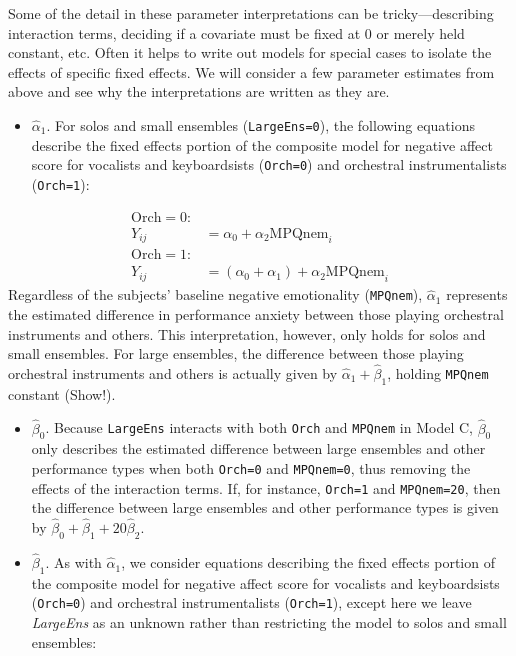\documentclass[
]{krantz}
\providecommand{\tightlist}{%
  \setlength{\itemsep}{0pt}\setlength{\parskip}{0pt}}
\begin{document}
Some of the detail in these parameter interpretations can be tricky---describing interaction terms, deciding if a covariate must be fixed at 0 or merely held constant, etc. Often it helps to write out models for special cases to isolate the effects of specific fixed effects. We will consider a few parameter estimates from above and see why the interpretations are written as they are.

\begin{itemize}
\tightlist
\item
  \(\hat{\alpha}_{1}\). For solos and small ensembles (\texttt{LargeEns=0}), the following equations describe the fixed effects portion of the composite model for negative affect score for vocalists and keyboardsists (\texttt{Orch=0}) and orchestral instrumentalists (\texttt{Orch=1}):
\end{itemize}

\begin{align*}
\textrm{Orch}=0: & \\
Y_{ij} & = \alpha_{0}+\alpha_{2}\textrm{MPQnem}_{i} \\
\textrm{Orch}=1: & \\
Y_{ij} & = (\alpha_{0}+\alpha_{1})+\alpha_{2}\textrm{MPQnem}_{i}
\end{align*}
Regardless of the subjects' baseline negative emotionality (\texttt{MPQnem}), \(\hat{\alpha}_{1}\) represents the estimated difference in performance anxiety between those playing orchestral instruments and others. This interpretation, however, only holds for solos and small ensembles. For large ensembles, the difference between those playing orchestral instruments and others is actually given by \(\hat{\alpha}_{1}+\hat{\beta}_{1}\), holding \texttt{MPQnem} constant (Show!).

\begin{itemize}
\tightlist
\item
  \(\hat{\beta}_{0}\). Because \texttt{LargeEns} interacts with both \texttt{Orch} and \texttt{MPQnem} in Model C, \(\hat{\beta}_{0}\) only describes the estimated difference between large ensembles and other performance types when both \texttt{Orch=0} and \texttt{MPQnem=0}, thus removing the effects of the interaction terms. If, for instance, \texttt{Orch=1} and \texttt{MPQnem=20}, then the difference between large ensembles and other performance types is given by \(\hat{\beta}_{0}+\hat{\beta}_{1}+20\hat{\beta}_{2}\).
\item
  \(\hat{\beta}_{1}\). As with \(\hat{\alpha}_{1}\), we consider equations describing the fixed effects portion of the composite model for negative affect score for vocalists and keyboardsists (\texttt{Orch=0}) and orchestral instrumentalists (\texttt{Orch=1}), except here we leave \emph{LargeEns} as an unknown rather than restricting the model to solos and small ensembles:
\end{itemize}
\end{document}
